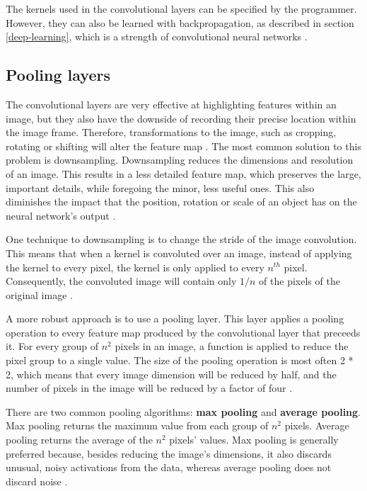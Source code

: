 ﻿\documentclass[12pt,a4paper,notitlepage]{article}
\begin{document}
The kernels used in the convolutional layers can be specified by the programmer. However, they can also be learned with backpropagation, as described in section \ref{deep-learning}, which is a strength of convolutional neural networks \cite{brownlee_gentle_2019}.

\subsection{Pooling layers}
The convolutional layers are very effective at highlighting features within an image, but they also have the downside of recording their precise location within the image frame. Therefore, transformations to the image, such as cropping, rotating or shifting will alter the feature map \cite{brownlee_gentle_2019}.
The most common solution to this problem is downsampling. Downsampling reduces the dimensions and resolution of an image. This results in a less detailed feature map, which preserves the large, important details, while foregoing the minor, less useful ones. This also diminishes the impact that the position, rotation or scale of an object has on the neural network's output \cite{brownlee_gentle_2019}.

One technique to downsampling is to change the stride of the image convolution. This means that when a kernel is convoluted over an image, instead of applying the kernel to every pixel, the kernel is only applied to every \(n^{th}\) pixel. Consequently, the convoluted image will contain only \(1/n\) of the pixels of the original image \cite{brownlee_gentle_2019}.

A more robust approach is to use a pooling layer. This layer applies a pooling operation to every feature map produced by the convolutional layer that preceeds it. For every group of \(n^2\) pixels in an image, a function is applied to reduce the pixel group to a single value. The size of the pooling operation is most often 2 * 2, which means that every image dimension will be reduced by half, and the number of pixels in the image will be reduced by a factor of four \cite{brownlee_gentle_2019}.

There are two common pooling algorithms: \textbf{max pooling} and \textbf{average pooling}. Max pooling returns the maximum value from each group of \(n^2\) pixels. 
Average pooling returns the average of the \(n^2\) pixels' values. Max pooling is generally preferred because, besides reducing the image's dimensions, it also discards unusual, noisy activations from the data, whereas average pooling does not discard noise \cite{saha_comprehensive_2018}.
\end{document}
